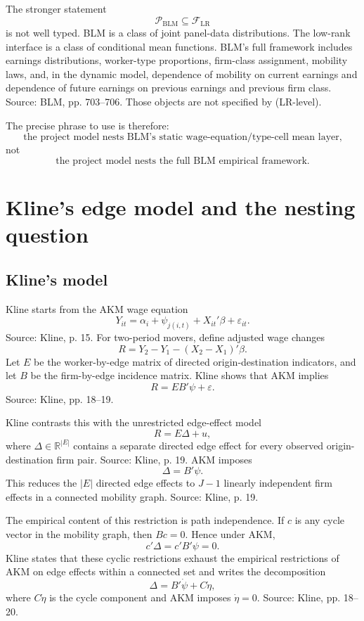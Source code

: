 \documentclass[11pt]{article}
\newcommand{\R}{\mathbb{R}}
\newcommand{\cF}{\mathcal{F}}
\newcommand{\cP}{\mathcal{P}}
\begin{document}
The stronger statement
\[
\cP_{\mathrm{BLM}}\subseteq \cF_{\mathrm{LR}}
\]
is not well typed. BLM is a class of joint panel-data distributions. The
low-rank interface is a class of conditional mean functions. BLM's full
framework includes earnings distributions, worker-type proportions, firm-class
assignment, mobility laws, and, in the dynamic model, dependence of mobility on
current earnings and dependence of future earnings on previous earnings and
previous firm class. Source: BLM, pp. 703--706. Those objects are not specified
by (LR-level).

The precise phrase to use is therefore:
\[
\text{the project model nests BLM's static wage-equation/type-cell mean layer,}
\]
not
\[
\text{the project model nests the full BLM empirical framework.}
\]

\section{Kline's edge model and the nesting question}

\subsection{Kline's model}

Kline starts from the AKM wage equation
\[
Y_{it}
=
\alpha_i+\psi_{j(i,t)}+X_{it}'\beta+\varepsilon_{it}.
\tag{AKM}
\]
Source: Kline, p. 15. For two-period movers, define adjusted wage changes
\[
R=Y_2-Y_1-(X_2-X_1)'\beta.
\]
Let \(E\) be the worker-by-edge matrix of directed origin-destination
indicators, and let \(B\) be the firm-by-edge incidence matrix. Kline shows
that AKM implies
\[
R=EB'\psi+\varepsilon.
\tag{AKM-edge}
\]
Source: Kline, pp. 18--19.

Kline contrasts this with the unrestricted edge-effect model
\[
R=E\Delta+u,
\tag{Kline-unrestricted}
\]
where \(\Delta\in\R^{|E|}\) contains a separate directed edge effect for every
observed origin-destination firm pair. Source: Kline, p. 19. AKM imposes
\[
\Delta=B'\psi.
\tag{Kline-AKM-restriction}
\]
This reduces the \(|E|\) directed edge effects to \(J-1\) linearly independent
firm effects in a connected mobility graph. Source: Kline, p. 19.

The empirical content of this restriction is path independence. If \(c\) is any
cycle vector in the mobility graph, then \(Bc=0\). Hence under AKM,
\[
c'\Delta=c'B'\psi=0.
\]
Kline states that these cyclic restrictions exhaust the empirical restrictions
of AKM on edge effects within a connected set and writes the decomposition
\[
\Delta=B'\dot\psi+C\dot\eta,
\]
where \(C\dot\eta\) is the cycle component and AKM imposes
\(\dot\eta=0\). Source: Kline, pp. 18--20.
\end{document}
